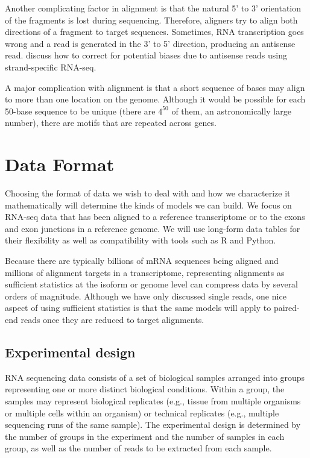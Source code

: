 \documentclass[11pt]{report}
\begin{document}
Another complicating factor in alignment is that the natural 5' to 3'
orientation of the fragments is lost during sequencing. Therefore,
aligners try to align both directions of a fragment to target
sequences. Sometimes, RNA transcription goes wrong and a read is
generated in the 3' to 5' direction, producing an antisense read.
\cite{mourao2019detection} discuss how to correct for potential biases
due to antisense reads using strand-specific RNA-seq.

A major complication with alignment is that a short sequence of bases
may align to more than one location on the genome. Although it would
be possible for each 50-base sequence to be unique (there are $4^{50}$
of them, an astronomically large number), there are motifs that are
repeated across genes.


\chapter{Data Format}\label{chap:data}

Choosing the format of data we wish to deal with and how we
characterize it mathematically will determine the kinds of models we
can build. We focus on RNA-seq data that has been aligned to a
reference transcriptome or to the exons and exon junctions in a
reference genome. We will use long-form data tables for their
flexibility as well as compatibility with tools such as R and Python.

Because there are typically billions of mRNA sequences being aligned
and millions of alignment targets in a transcriptome, representing
alignments as sufficient statistics at the isoform or genome level can
compress data by several orders of magnitude. Although we have only
discussed single reads, one nice aspect of using sufficient statistics
is that the same models will apply to paired-end reads once they are
reduced to target alignments.


\section{Experimental design}

RNA sequencing data consists of a set of biological samples arranged
into groups representing one or more distinct biological conditions.
Within a group, the samples may represent biological replicates (e.g.,
tissue from multiple organisms or multiple cells within an organism)
or technical replicates (e.g., multiple sequencing runs of the same
sample). The experimental design is determined by the number of groups
in the experiment and the number of samples in each group, as well as
the number of reads to be extracted from each sample.  
\end{document}
